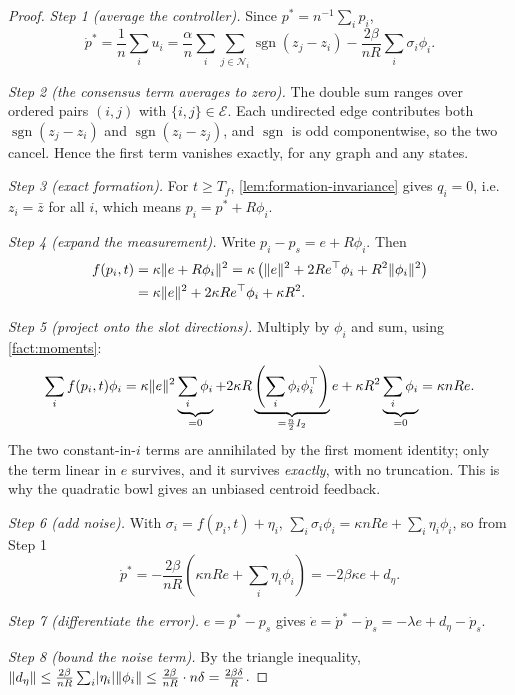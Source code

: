 \documentclass[11pt,a4paper]{article}
\theoremstyle{plain}
\theoremstyle{definition}
\newcommand{\E}{\mathcal{E}}
\DeclareMathOperator{\sgn}{sgn}
\DeclarePairedDelimiter{\norm}{\lVert}{\rVert}
\DeclarePairedDelimiter{\abs}{\lvert}{\rvert}
\begin{document}
\begin{proof}
\emph{Step 1 (average the controller).} Since $p^*=n^{-1}\sum_ip_i$,
\begin{equation*}
    \dot p^*=\frac1n\sum_iu_i
    =\frac{\alpha}{n}\sum_i\sum_{j\in\mathcal{N}_i}\sgn\!\left(z_j-z_i\right)
    -\frac{2\beta}{nR}\sum_i\sigma_i\phi_i.
\end{equation*}

\emph{Step 2 (the consensus term averages to zero).} The double sum ranges over ordered pairs
$(i,j)$ with $\{i,j\}\in\E$. Each undirected edge contributes both
$\sgn(z_j-z_i)$ and $\sgn(z_i-z_j)$, and $\sgn$ is odd componentwise, so the two cancel. Hence
the first term vanishes exactly, for any graph and any states.

\emph{Step 3 (exact formation).} For $t\geq T_f$, \cref{lem:formation-invariance} gives $q_i=0$,
i.e.\ $z_i=\bar z$ for all $i$, which means $p_i=p^*+R\phi_i$.

\emph{Step 4 (expand the measurement).} Write $p_i-p_s=e+R\phi_i$. Then
\begin{align*}
    f(p_i,t)&=\kappa\norm{e+R\phi_i}^2
    =\kappa\left(\norm{e}^2+2Re^{\top}\phi_i+R^2\norm{\phi_i}^2\right)\\
    &=\kappa\norm{e}^2+2\kappa Re^{\top}\phi_i+\kappa R^2 .
\end{align*}

\emph{Step 5 (project onto the slot directions).} Multiply by $\phi_i$ and sum, using
\cref{fact:moments}:
\begin{equation*}
    \sum_if(p_i,t)\phi_i
    =\kappa\norm{e}^2\underbrace{\sum_i\phi_i}_{=0}
    +2\kappa R\underbrace{\left(\sum_i\phi_i\phi_i^{\top}\right)}_{=\frac n2I_2}e
    +\kappa R^2\underbrace{\sum_i\phi_i}_{=0}
    =\kappa nRe.
\end{equation*}
The two constant-in-$i$ terms are annihilated by the first moment identity; only the term linear
in $e$ survives, and it survives \emph{exactly}, with no truncation. This is why the quadratic
bowl gives an unbiased centroid feedback.

\emph{Step 6 (add noise).} With $\sigma_i=f(p_i,t)+\eta_i$,
$\sum_i\sigma_i\phi_i=\kappa nRe+\sum_i\eta_i\phi_i$, so from Step 1
\begin{equation*}
    \dot p^*=-\frac{2\beta}{nR}\left(\kappa nRe+\sum_i\eta_i\phi_i\right)
    =-2\beta\kappa e+d_\eta .
\end{equation*}

\emph{Step 7 (differentiate the error).} $e=p^*-p_s$ gives
$\dot e=\dot p^*-\dot p_s=-\lambda e+d_\eta-\dot p_s$.

\emph{Step 8 (bound the noise term).} By the triangle inequality,
$\norm{d_\eta}\leq\frac{2\beta}{nR}\sum_i\abs{\eta_i}\norm{\phi_i}\leq\frac{2\beta}{nR}\cdot n\delta
=\frac{2\beta\delta}{R}$.
\end{proof}
\end{document}
